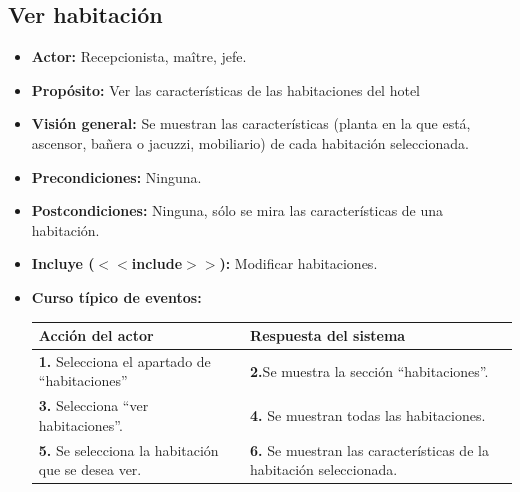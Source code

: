 \documentclass[spanish,a4paper,11pt, twoside]{report}	%
\begin{document}
	
	\hspace{-1.7 true cm}
	\subsection{Ver habitación}
		\begin{itemize}
			\item \textbf{Actor:} Recepcionista, maître, jefe.
			\item \textbf{Propósito: } Ver las características de las habitaciones del hotel
			\item \textbf{Visión general:} Se muestran las características (planta en la que
					está, ascensor, bañera o jacuzzi, mobiliario) de cada habitación seleccionada.
			\item \textbf{Precondiciones:} Ninguna.
			\item \textbf{Postcondiciones:} Ninguna, sólo se mira las características de una habitación.
			\item \textbf{Incluye ($<<$include$>>$):} Modificar habitaciones.
			\item \textbf{Curso típico de eventos:} 	\\
				\begin{tabular}{|p{6cm}||p{6cm}|}
				\hline
				\textbf{Acción del actor} & \textbf{Respuesta del sistema} \\ \hline
				\textbf{1.} Selecciona el apartado de ``habitaciones'' & 
				\textbf{2.}Se muestra la sección ``habitaciones''.\\ \hline 
				\textbf{3.} Selecciona ``ver habitaciones''. & 
				\textbf{4.} Se muestran todas las habitaciones.  \\ \hline
				\textbf{5.} Se selecciona la habitación que se desea ver. & 
				\textbf{6.} Se muestran las características de la habitación seleccionada. \\ \hline
			\end{tabular}
			\\
		\end {itemize}
		
\end{document}
